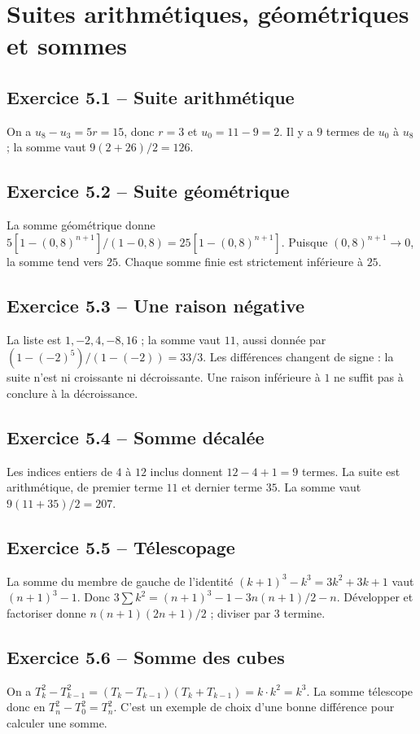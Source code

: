\chapter{Suites arithmétiques, géométriques et sommes}
\section*{Exercice 5.1 -- Suite arithmétique}
On a $u_8-u_3=5r=15$, donc $r=3$ et $u_0=11-9=2$. Il y a $9$ termes de $u_0$ à $u_8$ ; la somme vaut $9(2+26)/2=126$.

\section*{Exercice 5.2 -- Suite géométrique}
La somme géométrique donne $5[1-(0{,}8)^{n+1}]/(1-0{,}8)=25[1-(0{,}8)^{n+1}]$. Puisque $(0{,}8)^{n+1}\to0$, la somme tend vers $25$. Chaque somme finie est strictement inférieure à $25$.

\section*{Exercice 5.3 -- Une raison négative}
La liste est $1,-2,4,-8,16$ ; la somme vaut $11$, aussi donnée par $(1-(-2)^5)/(1-(-2))=33/3$. Les différences changent de signe : la suite n'est ni croissante ni décroissante. Une raison inférieure à $1$ ne suffit pas à conclure à la décroissance.

\section*{Exercice 5.4 -- Somme décalée}
Les indices entiers de $4$ à $12$ inclus donnent $12-4+1=9$ termes. La suite est arithmétique, de premier terme $11$ et dernier terme $35$. La somme vaut $9(11+35)/2=207$.

\section*{Exercice 5.5 -- Télescopage}
La somme du membre de gauche de l'identité $(k+1)^3-k^3=3k^2+3k+1$ vaut $(n+1)^3-1$. Donc $3\sum k^2=(n+1)^3-1-3n(n+1)/2-n$. Développer et factoriser donne $n(n+1)(2n+1)/2$ ; diviser par $3$ termine.

\section*{Exercice 5.6 -- Somme des cubes}
On a $T_k^2-T_{k-1}^2=(T_k-T_{k-1})(T_k+T_{k-1})=k\cdot k^2=k^3$. La somme télescope donc en $T_n^2-T_0^2=T_n^2$. C'est un exemple de choix d'une bonne différence pour calculer une somme.
